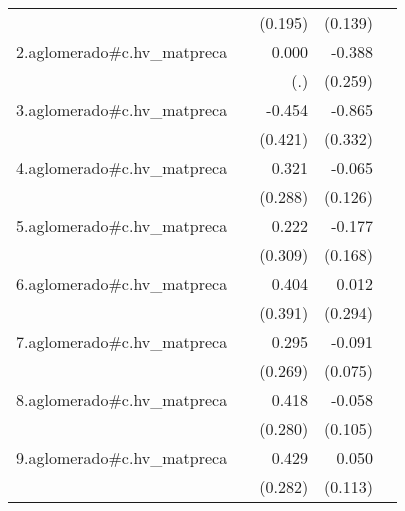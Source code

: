{\begin{longtable}{l*{4}{D{.}{.}{-1}}}
            &                     &     (0.195)         &     (0.139)         &                     \\
\addlinespace
2.aglomerado#c.hv\_matpreca&                     &       0.000         &      -0.388         &                     \\
            &                     &         (.)         &     (0.259)         &                     \\
\addlinespace
3.aglomerado#c.hv\_matpreca&                     &      -0.454         &      -0.865\sym{**} &                     \\
            &                     &     (0.421)         &     (0.332)         &                     \\
\addlinespace
4.aglomerado#c.hv\_matpreca&                     &       0.321         &      -0.065         &                     \\
            &                     &     (0.288)         &     (0.126)         &                     \\
\addlinespace
5.aglomerado#c.hv\_matpreca&                     &       0.222         &      -0.177         &                     \\
            &                     &     (0.309)         &     (0.168)         &                     \\
\addlinespace
6.aglomerado#c.hv\_matpreca&                     &       0.404         &       0.012         &                     \\
            &                     &     (0.391)         &     (0.294)         &                     \\
\addlinespace
7.aglomerado#c.hv\_matpreca&                     &       0.295         &      -0.091         &                     \\
            &                     &     (0.269)         &     (0.075)         &                     \\
\addlinespace
8.aglomerado#c.hv\_matpreca&                     &       0.418         &      -0.058         &                     \\
            &                     &     (0.280)         &     (0.105)         &                     \\
\addlinespace
9.aglomerado#c.hv\_matpreca&                     &       0.429         &       0.050         &                     \\
            &                     &     (0.282)         &     (0.113)         &                     \\

\end{longtable}}
